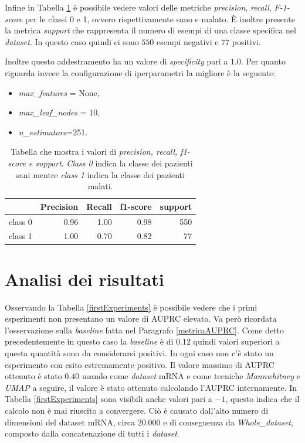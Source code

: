 \documentclass[12pt,italian]{report}
\begin{document}
	Infine in Tabella \ref{classification_report} è possibile vedere valori delle metriche \textit{precision}, \textit{recall}, \textit{F-1-score} per le classi 0 e 1, ovvero rispettivamente sano e malato. È inoltre presente la metrica \textit{support} che rappresenta il numero di esempi di una classe specifica nel \textit{dataset}. In questo caso quindi ci sono $550$ esempi negativi e $77$ positivi.
	
	Inoltre questo addestramento ha un valore di \textit{specificity} pari a $1.0$. Per quanto riguarda invece la configurazione di iperparametri la migliore è la seguente:
	\begin{itemize}
		\item \textit{max\_features} = None,
		\item \textit{max\_leaf\_nodes} = 10,
		\item \textit{n\_estimators}=251.
	\end{itemize}
	\begin{table}[h]
		\centering
		\begin{tabular}{lrrrr}
			\toprule
			{} & Precision & Recall & f1-score & support \\ \midrule
			class 0 & 0.96 & 1.00 & 0.98 & 550  \\
			class 1 & 1.00 & 0.70 & 0.82 & 77 \\
			\bottomrule
		\end{tabular}
		\caption{Tabella che mostra i valori di \textit{precision, recall, f1-score e support}. \textit{Class 0} indica la classe dei pazienti sani mentre \textit{class 1} indica la classe dei pazienti malati.}
		\label{classification_report}
	\end{table}
	

	\clearpage
	
	\section{Analisi dei risultati}
	Osservando la Tabella \ref{firstExperiments} è possibile vedere che i primi esperimenti non presentano un valore di AUPRC elevato. Va però ricordata l'osservazione sulla \textit{baseline} fatta nel Paragrafo \ref{metricaAUPRC}. Come detto precedentemente in questo caso la \textit{baseline} è di $0.12$ quindi valori superiori a questa quantità sono da considerarsi positivi. In ogni caso non c'è stato un esperimento con esito estremamente positivo. Il valore massimo di AUPRC ottenuto è stato $0.40$ usando come \textit{dataset} mRNA e come tecniche \textit{Mannwhitney} e \textit{UMAP} a seguire, il valore è stato ottenuto calcolando l'AUPRC internamente. In Tabella \ref{firstExperiments} sono visibili anche valori pari a $-1$, questo indica che il calcolo non è mai riuscito a convergere. Ciò è causato dall'alto numero di dimensioni del dataset mRNA, circa $20.000$ e di conseguenza da \textit{Whole\_dataset}, composto dalla concatenazione di tutti i \textit{dataset}.
	
\end{document}
